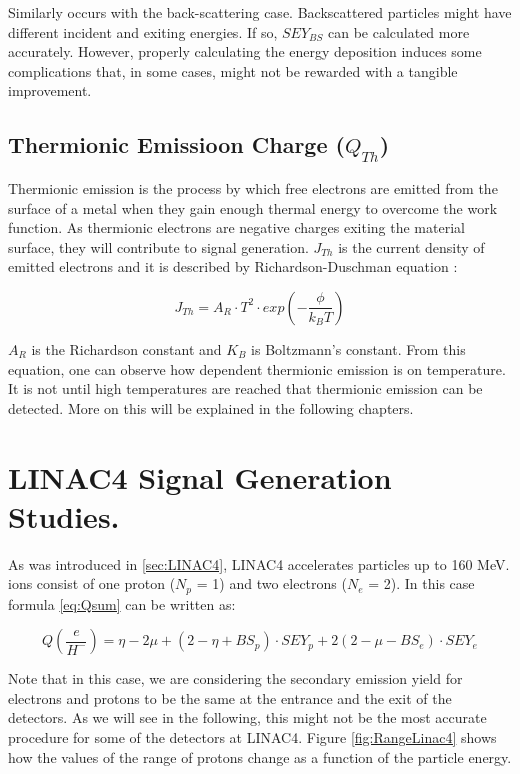Similarly occurs with the back-scattering case. Backscattered particles might have different incident and exiting energies. If so,  $SEY_{BS}$ can be calculated more accurately. However, properly calculating the energy deposition induces some complications that, in some cases, might not be rewarded with a tangible improvement. 

\subsection{Thermionic Emissioon Charge ($Q_{Th}$)}
\label{sec:ThermoCurrent}
Thermionic emission is the process by which free electrons are emitted from the surface of a metal when they gain enough thermal energy to overcome the work function. As thermionic electrons are negative charges exiting the material surface, they will contribute to signal generation. $J_{Th}$ is the current density of emitted electrons and it is described by Richardson-Duschman equation \parencite[][]{ref:Richardson}:

\begin{equation}
    J_{Th} = A_R \cdot T^2 \cdot exp\left(-\frac{\phi}{k_B T} \right) 
    \label{eq:ThermoCurrent}
\end{equation}

$A_R$ is the Richardson constant and $K_B$ is Boltzmann's constant. From this equation, one can observe how dependent thermionic emission is on temperature. It is not until high temperatures are reached that thermionic emission can be detected. More on this will be explained in the following chapters. 

\section{LINAC4 Signal Generation Studies.}

As was introduced in \ref{sec:LINAC4}, LINAC4 accelerates \hm particles up to 160 MeV. \hm ions consist of one proton ($N_p$ = 1) and two electrons ($N_e$ = 2). In this case formula \ref{eq:Qsum} can be written as: 

\begin{equation}
    Q\left(\frac{e}{H^{-}}\right) = \eta - 2\mu + \left( 2 - \eta + BS_p \right) \cdot SEY_p +2\left( 2 - \mu - BS_e \right) \cdot SEY_e
    \label{eq:Ql4}
\end{equation}

Note that in this case, we are considering the secondary emission yield for electrons and protons to be the same at the entrance and the exit of the detectors. As we will see in the following, this might not be the most accurate procedure for some of the detectors at LINAC4. Figure \ref{fig:RangeLinac4} shows how the values of the range of protons change as a function of the particle energy. 

